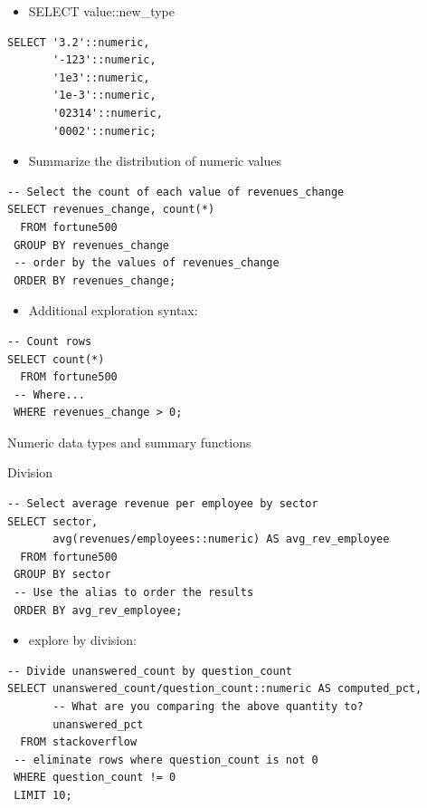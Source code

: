 \documentclass[]{book}
\providecommand{\tightlist}{%
  \setlength{\itemsep}{0pt}\setlength{\parskip}{0pt}}
\begin{document}
\begin{itemize}
\tightlist
\item
  SELECT value::new\_type
\end{itemize}

\begin{verbatim}
SELECT '3.2'::numeric,
       '-123'::numeric,
       '1e3'::numeric,
       '1e-3'::numeric,
       '02314'::numeric,
       '0002'::numeric;
\end{verbatim}

\begin{itemize}
\tightlist
\item
  Summarize the distribution of numeric values
\end{itemize}

\begin{verbatim}
-- Select the count of each value of revenues_change
SELECT revenues_change, count(*) 
  FROM fortune500
 GROUP BY revenues_change 
 -- order by the values of revenues_change
 ORDER BY revenues_change;
\end{verbatim}

\begin{itemize}
\tightlist
\item
  Additional exploration syntax:
\end{itemize}

\begin{verbatim}
-- Count rows 
SELECT count(*)
  FROM fortune500
 -- Where...
 WHERE revenues_change > 0;
\end{verbatim}

Numeric data types and summary functions

Division

\begin{verbatim}
-- Select average revenue per employee by sector
SELECT sector, 
       avg(revenues/employees::numeric) AS avg_rev_employee
  FROM fortune500
 GROUP BY sector
 -- Use the alias to order the results
 ORDER BY avg_rev_employee;
\end{verbatim}

\begin{itemize}
\tightlist
\item
  explore by division:
\end{itemize}

\begin{verbatim}
-- Divide unanswered_count by question_count
SELECT unanswered_count/question_count::numeric AS computed_pct, 
       -- What are you comparing the above quantity to?
       unanswered_pct
  FROM stackoverflow
 -- eliminate rows where question_count is not 0
 WHERE question_count != 0
 LIMIT 10;
 
\end{verbatim}
\end{document}
